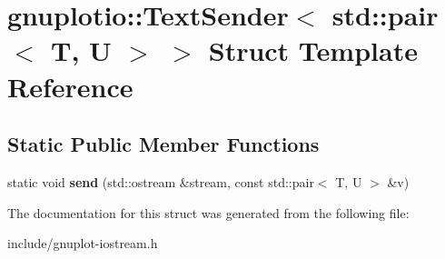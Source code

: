\hypertarget{structgnuplotio_1_1TextSender_3_01std_1_1pair_3_01T_00_01U_01_4_01_4}{}\section{gnuplotio\+:\+:Text\+Sender$<$ std\+:\+:pair$<$ T, U $>$ $>$ Struct Template Reference}
\label{structgnuplotio_1_1TextSender_3_01std_1_1pair_3_01T_00_01U_01_4_01_4}
\subsection*{Static Public Member Functions}
\begin{DoxyCompactItemize}
\item 
\mbox{\label{structgnuplotio_1_1TextSender_3_01std_1_1pair_3_01T_00_01U_01_4_01_4_ae1f3a6ffd8a60bb73d787578327154d1}} 
static void {\bfseries send} (std\+::ostream \&stream, const std\+::pair$<$ T, U $>$ \&v)
\end{DoxyCompactItemize}


The documentation for this struct was generated from the following file\+:\begin{DoxyCompactItemize}
\item 
include/gnuplot-\/iostream.\+h\end{DoxyCompactItemize}
